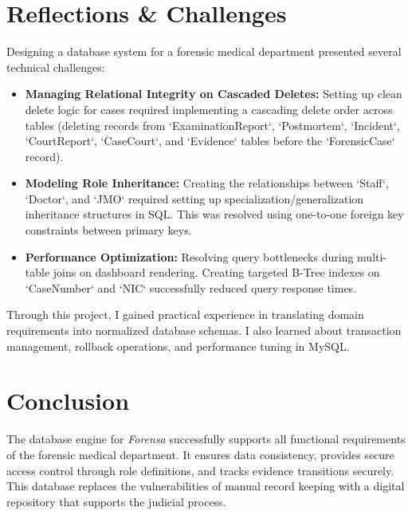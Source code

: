 \documentclass[12pt,a4paper]{article}
\begin{document}
\section{Reflections \& Challenges}
Designing a database system for a forensic medical department presented several technical challenges:
\begin{itemize}
    \item \textbf{Managing Relational Integrity on Cascaded Deletes:} Setting up clean delete logic for cases required implementing a cascading delete order across tables (deleting records from `ExaminationReport`, `Postmortem`, `Incident`, `CourtReport`, `CaseCourt`, and `Evidence` tables before the `ForensicCase` record).
    \item \textbf{Modeling Role Inheritance:} Creating the relationships between `Staff`, `Doctor`, and `JMO` required setting up specialization/generalization inheritance structures in SQL. This was resolved using one-to-one foreign key constraints between primary keys.
    \item \textbf{Performance Optimization:} Resolving query bottlenecks during multi-table joins on dashboard rendering. Creating targeted B-Tree indexes on `CaseNumber` and `NIC` successfully reduced query response times.
\end{itemize}

Through this project, I gained practical experience in translating domain requirements into normalized database schemas. I also learned about transaction management, rollback operations, and performance tuning in MySQL.

\section{Conclusion}
The database engine for \textit{Forensa} successfully supports all functional requirements of the forensic medical department. It ensures data consistency, provides secure access control through role definitions, and tracks evidence transitions securely. This database replaces the vulnerabilities of manual record keeping with a digital repository that supports the judicial process.
\end{document}
